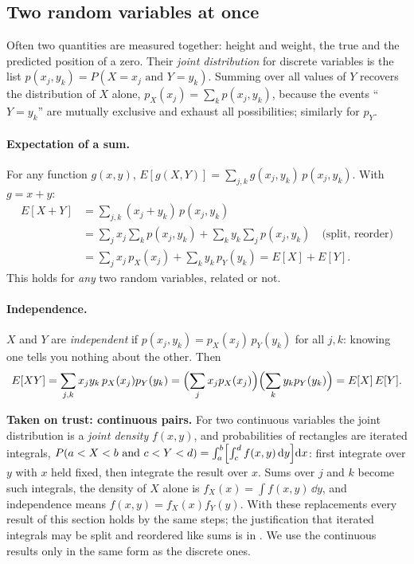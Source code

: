 \subsection{Two random variables at once}

Often two quantities are measured together: height and weight, the true and the predicted position of a zero. Their \emph{joint distribution} for discrete variables is the list $p(x_j,y_k)=P(X=x_j\text{ and }Y=y_k)$. Summing over all values of $Y$ recovers the distribution of $X$ alone, $p_X(x_j)=\sum_k p(x_j,y_k)$, because the events ``$Y=y_k$'' are mutually exclusive and exhaust all possibilities; similarly for $p_Y$.

\paragraph{Expectation of a sum.} For any function $g(x,y)$, $E[g(X,Y)]=\sum_{j,k}g(x_j,y_k)\,p(x_j,y_k)$. With $g=x+y$:
\begin{align*}
E[X+Y] &= \sum_{j,k}(x_j+y_k)\,p(x_j,y_k)\\
&= \sum_j x_j\sum_k p(x_j,y_k) + \sum_k y_k\sum_j p(x_j,y_k) \quad\text{(split, reorder)}\\
&= \sum_j x_j\,p_X(x_j)+\sum_k y_k\,p_Y(y_k) = E[X]+E[Y].
\end{align*}
This holds for \emph{any} two random variables, related or not.

\paragraph{Independence.} $X$ and $Y$ are \emph{independent} if $p(x_j,y_k)=p_X(x_j)\,p_Y(y_k)$ for all $j,k$: knowing one tells you nothing about the other. Then
\begin{equation}
E[XY]=\sum_{j,k}x_jy_k\,p_X(x_j)p_Y(y_k) = \Bigl(\sum_j x_jp_X(x_j)\Bigr)\Bigl(\sum_ky_kp_Y(y_k)\Bigr)=E[X]\,E[Y].
\label{eq:probability-indep-product}
\end{equation}
\begin{beyond}
\textbf{Taken on trust: continuous pairs.} For two continuous variables the joint distribution is a \emph{joint density} $f(x,y)$, and probabilities of rectangles are iterated integrals, $P(a<X<b\text{ and }c<Y<d)=\int_a^b\Bigl[\int_c^d f(x,y)\,\mathrm{d} y\Bigr]\mathrm{d} x$: first integrate over $y$ with $x$ held fixed, then integrate the result over $x$. Sums over $j$ and $k$ become such integrals, the density of $X$ alone is $f_X(x)=\int f(x,y)\,\dd y$, and independence means $f(x,y)=f_X(x)f_Y(y)$. With these replacements every result of this section holds by the same steps; the justification that iterated integrals may be split and reordered like sums is in \cite{rhb}. We use the continuous results only in the same form as the discrete ones.
\end{beyond}


